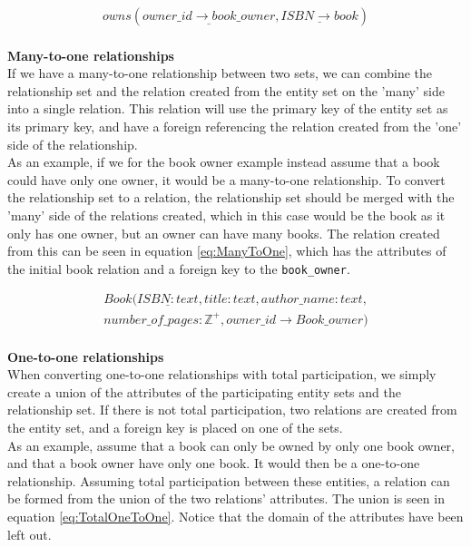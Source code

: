 \begin{equation}\label{eq:ManyToMany}
    \begin{split}
        owns(\underline{owner\_id \rightarrow book\_owner}, \underline{ISBN \rightarrow book})
    \end{split}
\end{equation}
\\
\textbf{Many-to-one relationships}\\
If we have a many-to-one relationship between two sets, we can combine the relationship set and the relation created from the entity set on the 'many' side into a single relation. This relation will use the primary key of the entity set as its primary key, and have a foreign referencing the relation created from the 'one' side of the relationship.\\
As an example, if we for the book owner example instead assume that a book could have only one owner, it would be a many-to-one relationship. To convert the relationship set to a relation, the relationship set should be merged with the 'many' side of the relations created, which in this case would be the book as it only has one owner, but an owner can have many books. The relation created from this can be seen in equation \ref*{eq:ManyToOne}, which has the attributes of the initial book relation and a foreign key to the \texttt{book\_owner}.

\begin{equation}\label{eq:ManyToOne}
    \begin{split}
        Book(\underline{ISBN : text} , title : text , author\_name : text , \\number\_of\_pages : \mathbb{Z}^+, owner\_id \rightarrow Book\_owner)
    \end{split}
\end{equation}
\\
\textbf{One-to-one relationships}\\
When converting one-to-one relationships with total participation, we simply create a union of the attributes of the participating entity sets and the relationship set\cite{DBSBook}. If there is not total participation, two relations are created from the entity set, and a foreign key is placed on one of the sets.\\
As an example, assume that a book can only be owned by only one book owner, and that a book owner have only one book. It would then be a one-to-one relationship. Assuming total participation between these entities, a relation can be formed from the union of the two relations' attributes. The union is seen in equation \ref*{eq:TotalOneToOne}. Notice that the domain of the attributes have been left out. 

